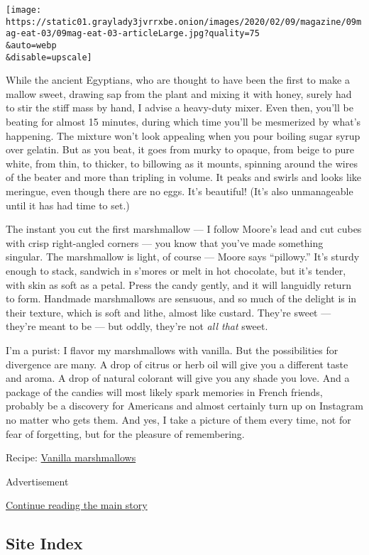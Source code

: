 \texttt{[image: https://static01.graylady3jvrrxbe.onion/images/2020/02/09/magazine/09mag-eat-03/09mag-eat-03-articleLarge.jpg?quality=75\\\&auto=webp\\\&disable=upscale]}

While the ancient Egyptians, who are thought to have been the first to
make a mallow sweet, drawing sap from the plant and mixing it with
honey, surely had to stir the stiff mass by hand, I advise a heavy-duty
mixer. Even then, you'll be beating for almost 15 minutes, during which
time you'll be mesmerized by what's happening. The mixture won't look
appealing when you pour boiling sugar syrup over gelatin. But as you
beat, it goes from murky to opaque, from beige to pure white, from thin,
to thicker, to billowing as it mounts, spinning around the wires of the
beater and more than tripling in volume. It peaks and swirls and looks
like meringue, even though there are no eggs. It's beautiful! (It's also
unmanageable until it has had time to set.)

The instant you cut the first marshmallow --- I follow Moore's lead and
cut cubes with crisp right-angled corners --- you know that you've made
something singular. The marshmallow is light, of course --- Moore says
``pillowy.'' It's sturdy enough to stack, sandwich in s'mores or melt in
hot chocolate, but it's tender, with skin as soft as a petal. Press the
candy gently, and it will languidly return to form. Handmade
marshmallows are sensuous, and so much of the delight is in their
texture, which is soft and lithe, almost like custard. They're sweet ---
they're meant to be --- but oddly, they're not \emph{all that} sweet.

I'm a purist: I flavor my marshmallows with vanilla. But the
possibilities for divergence are many. A drop of citrus or herb oil will
give you a different taste and aroma. A drop of natural colorant will
give you any shade you love. And a package of the candies will most
likely spark memories in French friends, probably be a discovery for
Americans and almost certainly turn up on Instagram no matter who gets
them. And yes, I take a picture of them every time, not for fear of
forgetting, but for the pleasure of remembering.

Recipe:
\href{https://cooking.nytimes3xbfgragh.onion/recipes/1020847-vanilla-marshmallows}{Vanilla
marshmallows}

Advertisement

\protect\hyperlink{after-bottom}{Continue reading the main story}

\hypertarget{site-index}{%
\subsection{Site Index}\label{site-index}}

